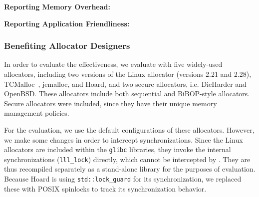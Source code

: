 \begin{table}[h]
  \centering
  \footnotesize
  \setlength{\tabcolsep}{0.2em}
\begin{tabular}{l|r|r|r|r|}
\hline
\end{tabular}
\end{table}

  

\textbf{Reporting Memory Overhead:} 


\textbf{Reporting Application Friendliness:} 

\subsubsection{Benefiting Allocator Designers}
In order to evaluate the effectiveness, we evaluate \MP{} with five widely-used allocators, including two versions of the Linux allocator (versions 2.21 and 2.28), TCMalloc~\cite{tcmalloc}, jemalloc, and Hoard, and two secure allocators, i.e. DieHarder and OpenBSD. These allocators include both sequential and BiBOP-style allocators. Secure allocators were included, since they have their unique memory management policies. 

For the evaluation, we use the default configurations of these allocators. However, we make some changes in order to  intercept synchronizations. Since the Linux allocators are included within the \texttt{glibc} libraries, they invoke the internal synchronizations (\texttt{lll\_lock}) directly, which cannot be intercepted by \MP{}. They are thus recompiled separately as a stand-alone library for the purposes of evaluation. Because Hoard is using \texttt{std::lock\_guard} for its synchronization, we replaced these with POSIX spinlocks to track its synchronization behavior.



 





